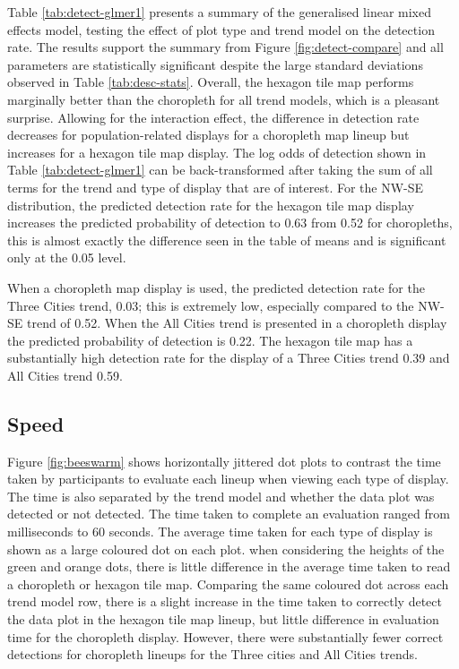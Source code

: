 \documentclass[times, doublespace]{anzsauth}
\begin{document}
Table \ref{tab:detect-glmer1} presents a summary of the generalised
linear mixed effects model, testing the effect of plot type and trend
model on the detection rate. The results support the summary from Figure
\ref{fig:detect-compare} and all parameters are statistically
significant despite the large standard deviations observed in Table
\ref{tab:desc-stats}. Overall, the hexagon tile map performs marginally
better than the choropleth for all trend models, which is a pleasant
surprise. Allowing for the interaction effect, the difference in
detection rate decreases for population-related displays for a
choropleth map lineup but increases for a hexagon tile map display. The
log odds of detection shown in Table \ref{tab:detect-glmer1} can be back-transformed after taking the sum of all terms for the trend and type of
display that are of interest. For the NW-SE distribution, the predicted
detection rate for the hexagon tile map display increases the predicted
probability of detection to 0.63 from 0.52 for choropleths, this is
almost exactly the difference seen in the table of means and is
significant only at the 0.05 level.

When a choropleth map display is used, the predicted detection rate for
the Three Cities trend, 0.03; this is extremely low, especially compared
to the NW-SE trend of 0.52. When the All Cities trend is presented in a
choropleth display the predicted probability of detection is 0.22. The
hexagon tile map has a substantially high detection rate for the display
of a Three Cities trend 0.39 and All Cities trend 0.59.

\subsection{Speed}\label{speed}

Figure \ref{fig:beeswarm} shows horizontally jittered dot plots to
contrast the time taken by participants to evaluate each lineup when
viewing each type of display. The time is also separated by the trend model
and whether the data plot was detected or not detected. The time taken
to complete an evaluation ranged from milliseconds to 60 seconds. The
average time taken for each type of display is shown as a large coloured dot
on each plot. when considering the heights of the green and orange dots,
there is little difference in the average time taken to read a
choropleth or hexagon tile map. Comparing the same coloured dot across
each trend model row, there is a slight increase in the time taken to
correctly detect the data plot in the hexagon tile map lineup, but
little difference in evaluation time for the choropleth display.
However, there were substantially fewer correct detections for choropleth
lineups for the Three cities and All Cities trends.
\end{document}
